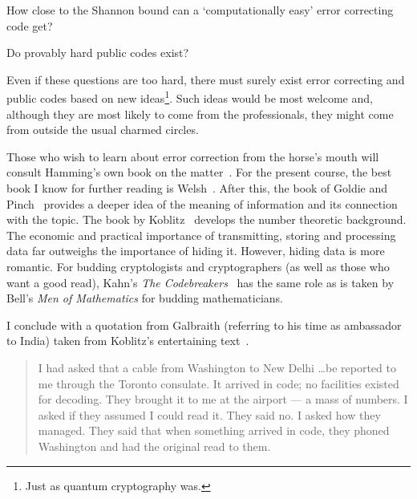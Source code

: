 \documentclass[12pt,a4paper]{article}
\theoremstyle{plain}
\theoremstyle{definition}
\begin{document}
How close to the Shannon bound can a
`computationally easy' error correcting code
get?

Do provably hard public codes exist?

Even if these questions are too hard, there
must surely exist error correcting and public
codes based on new ideas\footnote{Just as quantum
cryptography was.}. Such ideas would
be most welcome
and, although they are most likely to come
from the professionals, they might come
from outside the usual charmed circles.

Those who wish to learn about error correction
from the horse's mouth will consult Hamming's
own book on the matter~\cite{Hamming}.
For the present course,
the best book I know for further reading
is  Welsh~\cite{Welsh}. After this,
the book of Goldie and Pinch~\cite{Pinch} provides
a deeper idea of the meaning of information
and its connection with the topic. The book by
Koblitz~\cite{Koblitz} develops the number theoretic
background.
The economic and practical importance of
transmitting, storing and processing data
far outweighs the importance of hiding it.
However, hiding data is more romantic.
For budding cryptologists and cryptographers
(as well as those who want a good read),
Kahn's \emph{The Codebreakers}~\cite{Kahn Code}
has the same role as is taken by Bell's
\emph{Men of Mathematics}
for budding mathematicians.


I conclude with a quotation from Galbraith
(referring to his time as ambassador to India)
taken from Koblitz's entertaining text~\cite{Koblitz}.
\begin{quotation}
I had asked that a cable from Washington to New Delhi
\dots be reported to me through the Toronto consulate.
It arrived in code; no facilities existed for decoding.
They brought it to me at the airport --- a mass of
numbers. I asked if they assumed I could read it.
They said no. I asked how they managed.
They said that when something arrived in code,
they phoned Washington and had the original
read to them.
\end{quotation}
\end{document}
